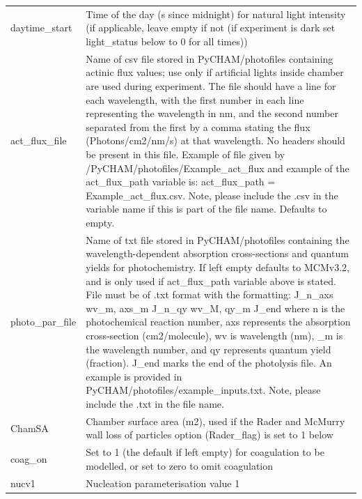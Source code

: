 \documentclass[gmd, manuscript]{copernicus}
\begin{document}
\begin{center}
\begin{supertabular}{p{0.15\textwidth}p{0.75\textwidth}}
daytime\_start & Time of the day (s since midnight) for natural light intensity (if applicable, leave empty if not (if experiment is dark set light\_status below to 0 for all times)) \\

act\_flux\_file & Name of csv file stored in PyCHAM/photofiles containing actinic flux values; use only if artificial lights inside chamber are used during experiment.  The file should have a line for each wavelength, with the first number in each line representing the wavelength in nm, and the second number separated from the first by a comma stating the flux (Photons/cm2/nm/s) at that wavelength.  No headers should be present in this file.  Example of file given by /PyCHAM/photofiles/Example\_act\_flux and example of the act\_flux\_path variable is: act\_flux\_path = Example\_act\_flux.csv.  Note, please include the .csv in the variable name if this is part of the file name.  Defaults to empty.\\

photo\_par\_file & Name of txt file stored in PyCHAM/photofiles containing the wavelength-dependent absorption cross-sections and quantum yields for photochemistry.  If left empty defaults to MCMv3.2, and is only used if act\_flux\_path variable above is stated.  File must be of .txt format with the formatting: \newline J\_n\_axs \newline wv\_m, axs\_m \newline J\_n\_qy \newline wv\_M, qy\_m \newline J\_end \newline where n is the photochemical reaction number, axs represents the absorption cross-section (cm2/molecule), wv is wavelength (nm), \_m is the wavelength number, and qy represents quantum yield (fraction).  J\_end marks the end of the photolysis file.  An example is provided in PyCHAM/photofiles/example\_inputs.txt.  Note, please include the .txt in the file name.\\

ChamSA & Chamber surface area (m2), used if the Rader and McMurry wall loss of particles option (Rader\_flag) is set to 1 below\\

coag\_on & Set to 1 (the default if left empty) for coagulation to be modelled, or set to zero to omit coagulation\\

nucv1 & Nucleation parameterisation value 1\\


\end{supertabular}
\end{center}
\end{document}
